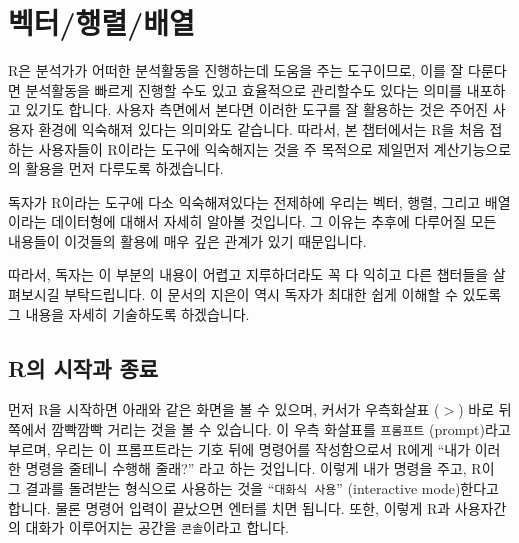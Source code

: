 \documentclass[tutorial.tex]{subfiles}
\begin{document}
\chapter{벡터/행렬/배열}

% 

R은 분석가가 어떠한 분석활동을 진행하는데 도움을 주는 도구이므로, 이를 잘 다룬다면 분석활동을 빠르게 진행할 수도 있고 효율적으로 관리할수도 있다는 의미를 내포하고 있기도 합니다. 
사용자 측면에서 본다면 이러한 도구를 잘 활용하는 것은 주어진 사용자 환경에 익숙해져 있다는 의미와도 같습니다. 
따라서, 본 챕터에서는 R을 처음 접하는 사용자들이 R이라는 도구에 익숙해지는 것을 주 목적으로 제일먼저 계산기능으로의 활용을 먼저 다루도록 하겠습니다.

독자가 R이라는 도구에 다소 익숙해져있다는 전제하에 우리는 벡터, 행렬, 그리고 배열이라는 데이터형에 대해서 자세히 알아볼 것입니다.
그 이유는 추후에 다루어질 모든 내용들이 이것들의 활용에 매우 깊은 관계가 있기 때문입니다. 

따라서, 독자는 이 부분의 내용이 어렵고 지루하더라도 꼭 다 익히고 다른 챕터들을 살펴보시길 부탁드립니다.
이 문서의 지은이 역시 독자가 최대한 쉽게 이해할 수 있도록 그 내용을 자세히 기술하도록 하겠습니다. 

\section{R의 시작과 종료}

먼저 R을 시작하면 아래와 같은 화면을 볼 수 있으며, 커서가 우측화살표 ($>$) 바로 뒤쪽에서 깜빡깜빡 거리는 것을 볼 수 있습니다.
이 우측 화살표를 \texttt{프롬프트} (prompt)라고 부르며, 우리는 이 프롬프트라는 기호 뒤에 명령어를 작성함으로서 R에게 ``내가 이러한 명령을 줄테니 수행해 줄래?'' 라고 하는 것입니다. 
이렇게 내가 명령을 주고, R이 그 결과를 돌려받는 형식으로 사용하는 것을 ``\texttt{대화식 사용}'' (interactive mode)한다고 합니다. 
물론 명령어 입력이 끝났으면 엔터를 치면 됩니다. 
또한, 이렇게 R과 사용자간의 대화가 이루어지는 공간을 \texttt{콘솔}이라고 합니다. 

\begin{Schunk}
\end{Schunk}
\end{document}
